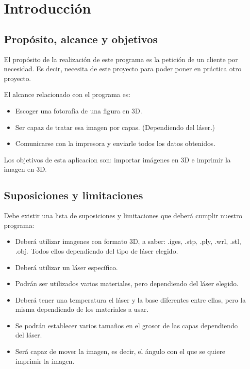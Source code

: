 \documentclass[a4paper,11pt, twoside]{article}
\begin{document}
\newpage
\thispagestyle{empty}
\tableofcontents
\cleardoublepage
\thispagestyle{empty}
\listoffigures %

\cleardoublepage
\thispagestyle{empty}
\listoftables %

\newpage
\setcounter{page}{1}
\section{Introducción}
\subsection{Propósito, alcance y objetivos} 
El propósito de la realización de este programa es la petición de un cliente por necesidad. Es decir, necesita de este proyecto para poder poner en práctica otro proyecto.

El alcance relacionado con el programa es:
\vspace{-2.5mm}
\begin{itemize}[noitemsep,topsep=0pt]
   \item Escoger una fotorafía de una figura en 3D.
   \item Ser capaz de tratar esa imagen por capas. (Dependiendo del láser.)
   \item Comunicarse con la impresora y enviarle todos los datos obtenidos.
\end{itemize}

Los objetivos de esta aplicacion son: importar imágenes en 3D e imprimir la imagen en 3D.
\subsection{Suposiciones y limitaciones}
Debe existir una lista de suposiciones y limitaciones que deberá cumplir nuestro programa:
\vspace{-2.5mm}
\begin{itemize}[noitemsep,topsep=0pt]
\item Deberá utilizar imagenes con formato 3D, a saber: .iges, .stp, .ply, .wrl, .stl, .obj. Todos ellos dependiendo del tipo de láser elegido.
\item Deberá utilizar un láser específico.
\item Podrán ser utilizados varios materiales, pero dependiendo del láser elegido.
\item Deberá tener una temperatura el láser y la base diferentes entre ellas, pero la misma dependiendo de los materiales a usar.
\item Se podrán establecer varios tamaños en el grosor de las capas dependiendo del láser.
\item Será capaz de mover la imagen, es decir, el ángulo con el que se quiere imprimir la imagen.
\end{itemize}
\end{document}
